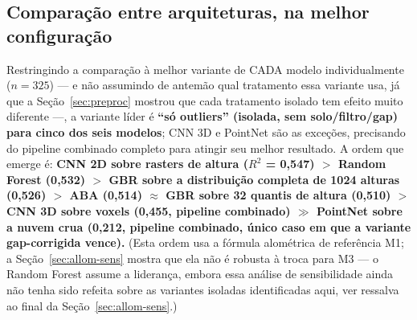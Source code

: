 \begin{table}[H]
  \centering
  \caption{Comparação entre modelos e variantes de pré-processamento (RMSE em
  Mg/ha; rRMSE em \%; $R^2$ adimensional; maior $R^2$ e menor RMSE/rRMSE são
  melhores). Colunas ``Só X'' são tratamentos isolados contra a mesma nuvem crua;
  ``Tudo combinado'' empilha os quatro juntos.}
  \label{tab:comparacao}
\end{table}

\subsection{Comparação entre arquiteturas, na melhor configuração}
\label{sec:arch}

Restringindo a comparação à melhor variante de CADA modelo individualmente
($n = 325$) --- e não assumindo de antemão qual tratamento essa variante usa, já
que a Seção~\ref{sec:preproc} mostrou que cada tratamento isolado tem efeito muito
diferente ---, a variante líder é \textbf{``só outliers'' (isolada, sem
solo/filtro/gap) para cinco dos seis modelos}; CNN 3D e PointNet são as exceções,
precisando do pipeline combinado completo para atingir seu melhor resultado. A
ordem que emerge é: \textbf{CNN 2D sobre rasters de altura ($R^2$ = 0,547) $>$
Random Forest (0,532) $>$ GBR sobre a distribuição completa de 1024 alturas
(0,526) $>$ ABA (0,514) $\approx$ GBR sobre 32 quantis de altura (0,510) $>$
CNN 3D sobre voxels (0,455, pipeline combinado) $\gg$ PointNet sobre a nuvem crua
(0,212, pipeline combinado, único caso em que a variante gap-corrigida vence).}
(Esta ordem usa a fórmula alométrica de referência M1; a
Seção~\ref{sec:allom-sens} mostra que ela não é robusta à troca para M3 --- o
Random Forest assume a liderança, embora essa análise de sensibilidade ainda não
tenha sido refeita sobre as variantes isoladas identificadas aqui, ver ressalva ao
final da Seção~\ref{sec:allom-sens}.)


